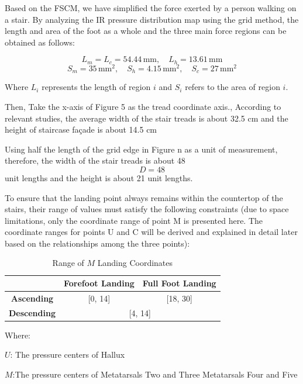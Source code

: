 \documentclass{mcmthesis}
\begin{document}
   Based on the FSCM, we have simplified the force exerted by a person walking on a stair. By analyzing the IR pressure distribution map using the grid method, the length and area of the foot as a whole and the three main force regions can be obtained as follows:
  
  \[
L_m = L_c = 54.44 \, \text{mm}, \quad L_h = 13.61 \, \text{mm}
\]
\[
S_m = 35 \, \text{mm}^2, \quad S_h = 4.15 \, \text{mm}^2, \quad S_c = 27 \, \text{mm}^2
\]
  
  
  Where \(L_i\) represents the length of region \(i\) and \(S_i\) refers to the area of region \(i\).
  
  Then, Take the x-axis of Figure 5 as the tread coordinate axis., According to relevant studies, the average width of the stair treads is about 32.5 cm and the height of staircase façade is about 14.5 cm \cite{WOS:000783553300001}
  
  Using half the length of the grid edge in Figure n as a unit of measurement, therefore, the width of the stair treads is about 48  \[D = 48\]
unit lengths and the height is about 21 unit lengths.
  
  To ensure that the landing point always remains within the countertop of the stairs, their range of values must satisfy the following constraints (due to space limitations, only the coordinate range of point M is presented here. The coordinate ranges for points U and C will be derived and explained in detail later based on the relationships among the three points):
  
  \begin{table}[h!]
    \centering
    \caption{Range of \(M\) Landing Coordinates}
    \begin{tabular}{@{}c cc@{}}
    \toprule
    \textbf{}      & \textbf{Forefoot Landing} & \textbf{Full Foot Landing} \\ \midrule
    \textbf{Ascending} & [0, 14]                  & [18, 30]                   \\ 
    \textbf{Descending} & \multicolumn{2}{c}{[4, 14]}                            \\ \bottomrule
    \end{tabular}
    \end{table}
  
  Where:
  
  \(U\): The pressure centers of Hallux  
  
  \(M\):The pressure centers of Metatarsals Two and Three Metatarsals Four and Five
  
\end{document}
